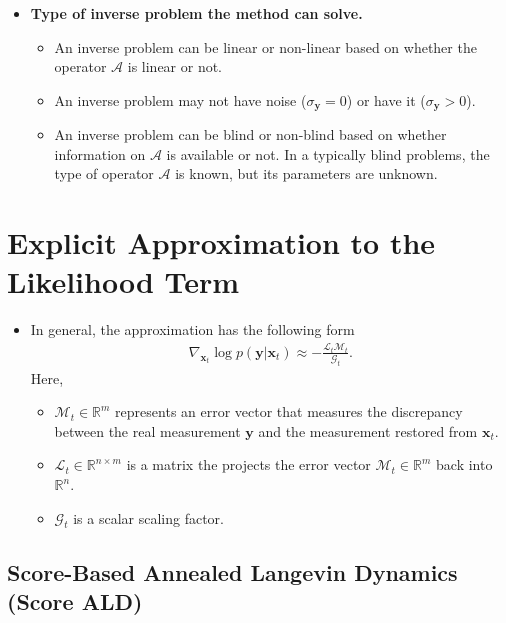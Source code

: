 \documentclass[10pt]{article}
\newcommand{\ve}[1]{\mathbf{#1}}
\newcommand{\mcal}[1]{\mathcal{#1}}
\newcommand{\Real}{\mathbb{R}}
\begin{document}
\begin{itemize}
\begin{itemize}
    \item {\bf Type of inverse problem the method can solve.}
    \begin{itemize}
      \item An inverse problem can be linear or non-linear based on whether the operator $\mcal{A}$ is linear or not.
      \item An inverse problem may not have noise ($\sigma_{\ve{y}} = 0$) or have it ($\sigma_{\ve{y}} > 0$).
      \item An inverse problem can be blind or non-blind based on whether information on $\mcal{A}$ is available or not. In a typically blind problems, the type of operator $\mcal{A}$ is known, but its parameters are unknown.
    \end{itemize}
  \end{itemize}
\end{itemize}

\section{Explicit Approximation to the Likelihood Term}

\begin{itemize}
  \item In general, the approximation has the following form
  \begin{align*}
    \nabla_{\ve{x}_t} \log p(\ve{y}|\ve{x}_t) \approx -\frac{\mcal{L}_t \mcal{M}_t}{\mcal{G}_t}.
  \end{align*}
  Here,
  \begin{itemize}
    \item $\mcal{M}_t \in \Real^m$ represents an error vector that measures the discrepancy between the real measurement $\ve{y}$ and the measurement restored from $\ve{x}_t$.
    \item $\mcal{L}_t \in \Real^{n \times m}$ is a matrix the projects the error vector $\mcal{M}_t \in \Real^m$ back into $\Real^n$.
    \item $\mcal{G}_t$ is a scalar scaling factor.
  \end{itemize}  
\end{itemize}

\subsection{Score-Based Annealed Langevin Dynamics (Score ALD)}
\end{document}
